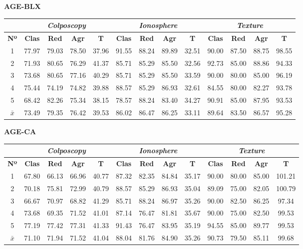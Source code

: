 \documentclass[12pt]{article}
\begin{document}
\textbf{AGE-BLX}

\begin{table}[ht!]
\begin{tabular}{ccccc|cccc|cccc}
\centering
 & \multicolumn{4}{c}{\textit{Colposcopy}} & \multicolumn{4}{c}{\textit{Ionosphere}} & \multicolumn{4}{c}{\textit{Texture}} \\ \hline
\textbf{Nº} & \textbf{Clas} & \textbf{Red} & \textbf{Agr} & \textbf{T} & \textbf{Clas} & \textbf{Red} & \textbf{Agr} & \textbf{T} & \textbf{Clas} & \textbf{Red} & \textbf{Agr} & \textbf{T} \\ \hline
1 & 77.97 & 79.03 & 78.50 & 37.96 & 91.55 & 88.24 & 89.89 & 32.51 & 90.00 & 87.50 & 88.75 & 98.55 \\
2 & 71.93 & 80.65 & 76.29 & 41.37 & 85.71 & 85.29 & 85.50 & 32.56 & 92.73 & 85.00 & 88.86 & 94.33 \\
3 & 73.68 & 80.65 & 77.16 & 40.29 & 85.71 & 85.29 & 85.50 & 33.59 & 90.00 & 80.00 & 85.00 & 96.19 \\
4 & 75.44 & 74.19 & 74.82 & 39.88 & 88.57 & 85.29 & 86.93 & 32.61 & 84.55 & 80.00 & 82.27 & 93.78 \\
5 & 68.42 & 82.26 & 75.34 & 38.15 & 78.57 & 88.24 & 83.40 & 34.27 & 90.91 & 85.00 & 87.95 & 93.53 \\
\hline
$\bar{x}$ & 73.49 & 79.35 & 76.42 & 39.53 & 86.02 & 86.47 & 86.25 & 33.11 & 89.64 & 83.50 & 86.57 & 95.28 \\
\end{tabular}
\end{table}

\textbf{AGE-CA}

\begin{table}[ht!]
\begin{tabular}{ccccc|cccc|cccc}
\centering
 & \multicolumn{4}{c}{\textit{Colposcopy}} & \multicolumn{4}{c}{\textit{Ionosphere}} & \multicolumn{4}{c}{\textit{Texture}} \\ \hline
\textbf{Nº} & \textbf{Clas} & \textbf{Red} & \textbf{Agr} & \textbf{T} & \textbf{Clas} & \textbf{Red} & \textbf{Agr} & \textbf{T} & \textbf{Clas} & \textbf{Red} & \textbf{Agr} & \textbf{T} \\ \hline
1 & 67.80 & 66.13 & 66.96 & 40.77 & 87.32 & 82.35 & 84.84 & 35.17 & 90.00 & 80.00 & 85.00 & 101.21 \\
2 & 70.18 & 75.81 & 72.99 & 40.79 & 88.57 & 85.29 & 86.93 & 35.04 & 89.09 & 75.00 & 82.05 & 100.79 \\
3 & 66.67 & 70.97 & 68.82 & 41.29 & 85.71 & 88.24 & 86.97 & 35.26 & 90.00 & 82.50 & 86.25 & 97.34 \\
4 & 73.68 & 69.35 & 71.52 & 41.01 & 87.14 & 76.47 & 81.81 & 35.67 & 90.00 & 75.00 & 82.50 & 99.53 \\
5 & 77.19 & 77.42 & 77.31 & 41.33 & 91.43 & 76.47 & 83.95 & 35.19 & 94.55 & 85.00 & 89.77 & 99.53 \\
\hline
$\bar{x}$ & 71.10 & 71.94 & 71.52 & 41.04 & 88.04 & 81.76 & 84.90 & 35.26 & 90.73 & 79.50 & 85.11 & 99.68 \\
\end{tabular}
\end{table}
\end{document}
